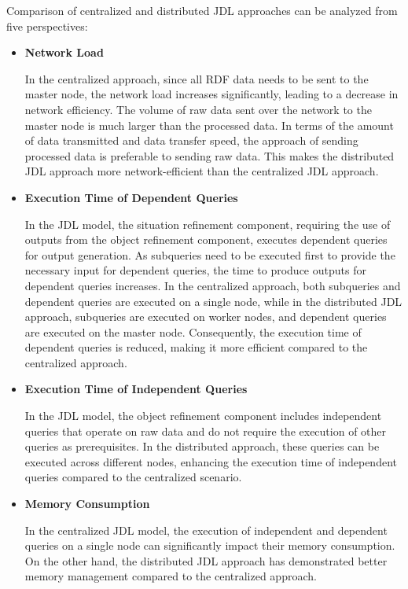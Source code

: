 \documentclass[5p,times]{elsarticle}
\begin{document}
Comparison of centralized and distributed JDL approaches can be analyzed from five perspectives:

\begin{itemize}
    \item \textbf{Network Load} 


In the centralized approach, since all RDF data needs to be sent to the master node, the network load increases significantly, leading to a decrease in network efficiency. The volume of raw data sent over the network to the master node is much larger than the processed data. In terms of the amount of data transmitted and data transfer speed, the approach of sending processed data is preferable to sending raw data. This makes the distributed JDL approach more network-efficient than the centralized JDL approach.
    
    \item \textbf{Execution Time of Dependent Queries}


In the JDL model, the situation refinement component, requiring the use of outputs from the object refinement component, executes dependent queries for output generation.
As subqueries need to be executed first to provide the necessary input for dependent queries, the time to produce outputs for dependent queries increases. In the centralized approach, both subqueries and dependent queries are executed on a single node, while in the distributed JDL approach, subqueries are executed on worker nodes, and dependent queries are executed on the master node. Consequently, the execution time of dependent queries is reduced, making it more efficient compared to the centralized approach.
    
    \item \textbf{Execution Time of Independent Queries}


    In the JDL model, the object refinement component includes independent queries that operate on raw data and do not require the execution of other queries as prerequisites. In the distributed approach, these queries can be executed across different nodes, enhancing the execution time of independent queries compared to the centralized scenario.
    
    \item \textbf{Memory Consumption}


 In the centralized JDL model, the execution of independent and dependent queries on a single node can significantly impact their memory consumption. On the other hand, the distributed JDL approach has demonstrated better memory management compared to the centralized approach.
    

\end{itemize}
\end{document}
